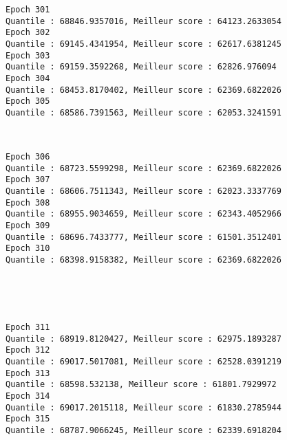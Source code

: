 \documentclass[11pt]{article}
\begin{document}
    \begin{Verbatim}[commandchars=\\\{\}]
Epoch 301
Quantile : 68846.9357016, Meilleur score : 64123.2633054
Epoch 302
Quantile : 69145.4341954, Meilleur score : 62617.6381245
Epoch 303
Quantile : 69159.3592268, Meilleur score : 62826.976094
Epoch 304
Quantile : 68453.8170402, Meilleur score : 62369.6822026
Epoch 305
Quantile : 68586.7391563, Meilleur score : 62053.3241591

    \end{Verbatim}

    \begin{center}
    \end{center}
    { \hspace*{\fill} \\}
    
    \begin{Verbatim}[commandchars=\\\{\}]
Epoch 306
Quantile : 68723.5599298, Meilleur score : 62369.6822026
Epoch 307
Quantile : 68606.7511343, Meilleur score : 62023.3337769
Epoch 308
Quantile : 68955.9034659, Meilleur score : 62343.4052966
Epoch 309
Quantile : 68696.7433777, Meilleur score : 61501.3512401
Epoch 310
Quantile : 68398.9158382, Meilleur score : 62369.6822026

    \end{Verbatim}

    \begin{center}
    \end{center}
    { \hspace*{\fill} \\}
    
    \begin{center}
    \end{center}
    { \hspace*{\fill} \\}
    
    \begin{Verbatim}[commandchars=\\\{\}]
Epoch 311
Quantile : 68919.8120427, Meilleur score : 62975.1893287
Epoch 312
Quantile : 69017.5017081, Meilleur score : 62528.0391219
Epoch 313
Quantile : 68598.532138, Meilleur score : 61801.7929972
Epoch 314
Quantile : 69017.2015118, Meilleur score : 61830.2785944
Epoch 315
Quantile : 68787.9066245, Meilleur score : 62339.6918204

    \end{Verbatim}
\end{document}
